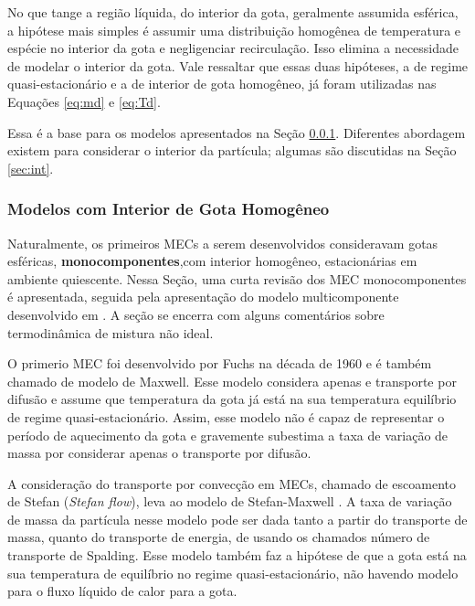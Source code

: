
No que tange a região líquida, do interior da gota, geralmente assumida esférica, a hipótese mais simples é assumir uma distribuição homogênea de temperatura e espécie no interior da gota e negligenciar recirculação.
Isso elimina a necessidade de modelar o interior da gota.
Vale ressaltar que essas duas hipóteses, a de regime quasi-estacionário e a de interior de gota homogêneo, já foram utilizadas nas Equações \eqref{eq:md} e \eqref{eq:Td}.

Essa é a base para os modelos apresentados na Seção \ref{sec:RMM}.
Diferentes abordagem existem para considerar o interior da partícula; algumas são discutidas na Seção \ref{sec:int}.




\subsubsection{Modelos com Interior de Gota Homogêneo} \label{sec:RMM}

Naturalmente, os primeiros MECs a serem desenvolvidos consideravam gotas esféricas, \textbf{monocomponentes},com interior homogêneo, estacionárias em ambiente quiescente.
Nessa Seção, uma curta revisão dos MEC monocomponentes é apresentada, seguida pela apresentação do modelo multicomponente desenvolvido em \cite{SacomanoF2022IJHMT}.
A seção se encerra com alguns comentários sobre termodinâmica de mistura não ideal.

O primerio MEC foi desenvolvido por Fuchs \cite{Fuchs1959} na década de 1960 e é também chamado de modelo de Maxwell.
Esse modelo considera apenas e transporte por difusão e assume que temperatura da gota já está na sua temperatura equilíbrio de regime quasi-estacionário.
Assim, esse modelo não é capaz de representar o período de aquecimento da gota e gravemente subestima a taxa de variação de massa por considerar apenas o transporte por difusão.

A consideração do transporte por convecção em MECs, chamado de escoamento de Stefan (\emph{Stefan flow}), leva ao modelo de Stefan-Maxwell \cite{Law1978}.
A taxa de variação de massa da partícula nesse modelo pode ser dada tanto a partir do transporte de massa, quanto do transporte de energia, de usando os chamados número de transporte de Spalding.
Esse modelo também faz a hipótese de que a gota está na sua temperatura de equilíbrio no regime quasi-estacionário, não havendo modelo para o fluxo líquido de calor para a gota.

